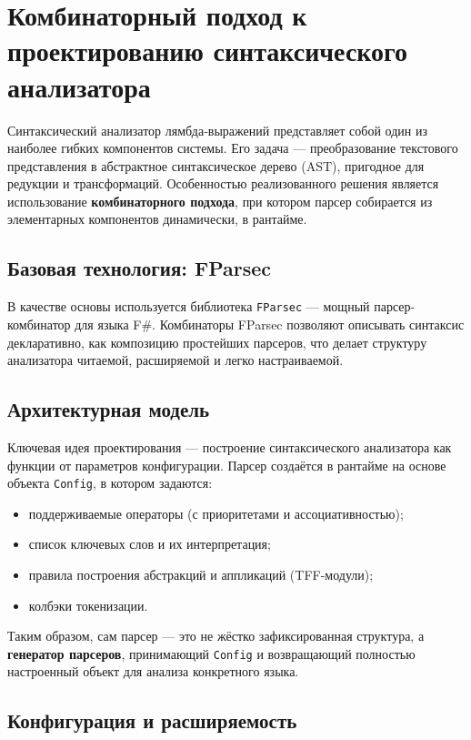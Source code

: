\section{Комбинаторный подход к проектированию синтаксического анализатора}
\label{sec:parser-api}

Синтаксический анализатор лямбда‑выражений представляет собой один из наиболее гибких компонентов системы. Его задача — преобразование текстового представления в абстрактное синтаксическое дерево (AST), пригодное для редукции и трансформаций. Особенностью реализованного решения является использование \textbf{комбинаторного подхода}, при котором парсер собирается из элементарных компонентов динамически, в рантайме.

\subsection{Базовая технология: FParsec}

В качестве основы используется библиотека \texttt{FParsec} — мощный парсер-комбинатор для языка F\#. Комбинаторы FParsec позволяют описывать синтаксис декларативно, как композицию простейших парсеров, что делает структуру анализатора читаемой, расширяемой и легко настраиваемой.

\subsection{Архитектурная модель}

Ключевая идея проектирования — построение синтаксического анализатора как функции от параметров конфигурации. Парсер создаётся в рантайме на основе объекта \texttt{Config}, в котором задаются:

\begin{itemize}
  \item поддерживаемые операторы (с приоритетами и ассоциативностью);
  \item список ключевых слов и их интерпретация;
  \item правила построения абстракций и аппликаций (TFF-модули);
  \item колбэки токенизации.
\end{itemize}

Таким образом, сам парсер — это не жёстко зафиксированная структура, а \textbf{генератор парсеров}, принимающий \texttt{Config} и возвращающий полностью настроенный объект для анализа конкретного языка.

\subsection{Конфигурация и расширяемость}

